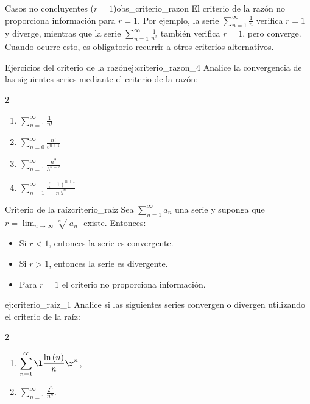 \begin{remark}{Casos no concluyentes ($r=1$)}{obs_criterio_razon}
    El criterio de la razón no proporciona información para $r=1$. Por ejemplo, la serie $\displaystyle \sum_{n=1}^{\infty} \frac{1}{n}$ verifica $r = 1$ y diverge, mientras que la serie $\displaystyle \sum_{n=1}^{\infty} \frac{1}{n^2}$ también verifica $r = 1$, pero converge. Cuando ocurre esto, es obligatorio recurrir a otros criterios alternativos.
\end{remark}

\begin{problem}{Ejercicios del criterio de la razón}{ej:criterio_razon_4}
    Analice la convergencia de las siguientes series mediante el criterio de la razón:
    \begin{multicols}{2}
        \begin{enumerate}
            \item $\displaystyle \sum_{n=1}^{\infty} \frac{1}{n!}$
            \item $\displaystyle \sum_{n=0}^{\infty} \frac{n!}{e^{n+1}}$
            \item $\displaystyle \sum_{n=1}^{\infty} \frac{n^2}{3^{n+2}}$
            \item $\displaystyle \sum_{n=1}^{\infty} \frac{(-1)^{n+1}}{n \, 5^n}$
        \end{enumerate}
    \end{multicols}
\end{problem}

\begin{theorem}{Criterio de la raíz}{criterio_raiz}
    Sea $\displaystyle \sum_{n=1}^{\infty} a_n$ una serie y suponga que $r = \displaystyle \lim_{n \to \infty} \sqrt[n]{|a_n|}$ existe. Entonces:
    \begin{itemize}
        \item Si $r < 1$, entonces la serie es convergente.
        \item Si $r > 1$, entonces la serie es divergente.
        \item Para $r = 1$ el criterio no proporciona información.
    \end{itemize}
\end{theorem}

\begin{example}{}{ej:criterio_raiz_1}
    Analice si las siguientes series convergen o divergen utilizando el criterio de la raíz:
    \begin{multicols}{2}
    \begin{enumerate}
        \item $\displaystyle \sum_{n=1}^{\infty} \l \frac{\ln{(n)}}{n} \r^n$,
        \item $\displaystyle \sum_{n=1}^{\infty} \frac{2^n}{n^n}$.
    \end{enumerate}
    \end{multicols}
\end{example}

